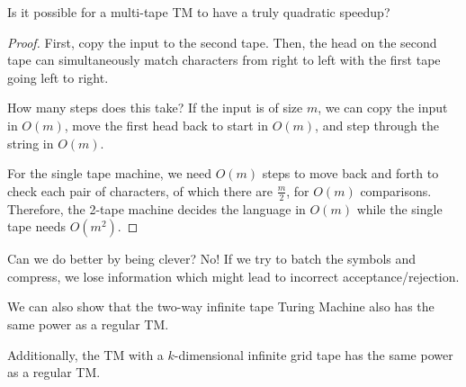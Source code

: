 Is it possible for a multi-tape TM to have a truly quadratic speedup?


\begin{proof}
	
	First, copy the input to the second tape.  Then, the head on the second tape can simultaneously match characters from right to left with the first tape going left to right.
	
	How many steps does this take?  If the input is of size $m$, we can copy the input in $O(m)$, move the first head back to start in $O(m)$, and step through the string in $O(m)$.
	
	For the single tape machine, we need $O(m)$ steps to move back and forth to check each pair of characters, of which there are $\frac{m}{2}$, for $O(m)$ comparisons.  Therefore, the 2-tape machine decides the language in $O(m)$ while the single tape needs $O(m^2)$.
	

	
\end{proof}

Can we do better by being clever?  No!  If we try to batch the symbols and compress, we lose information which might lead to incorrect acceptance/rejection.


We can also show that the two-way infinite tape Turing Machine also has the same power as a regular TM.

Additionally, the TM with a $k$-dimensional infinite grid tape has the same power as a regular TM.









